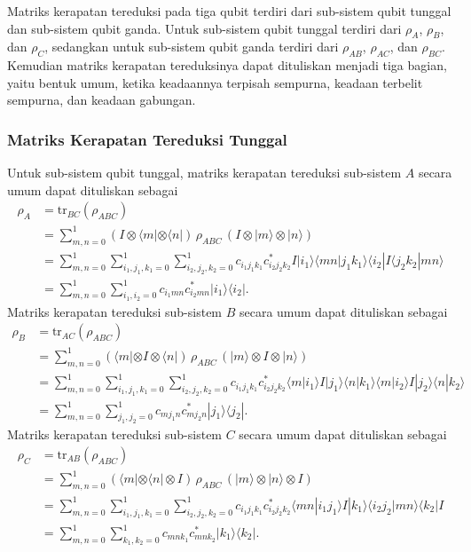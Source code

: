 Matriks kerapatan tereduksi pada tiga qubit terdiri dari sub-sistem qubit tunggal dan sub-sistem qubit ganda. Untuk sub-sistem qubit tunggal terdiri dari $\rho_A$, $\rho_B$, dan $\rho_C$, sedangkan untuk sub-sistem qubit ganda terdiri dari $\rho_{AB}$, $\rho_{AC}$, dan $\rho_{BC}$. Kemudian matriks kerapatan tereduksinya dapat dituliskan menjadi tiga bagian, yaitu bentuk umum, ketika keadaannya terpisah sempurna, keadaan terbelit sempurna, dan keadaan gabungan.

\subsubsection{Matriks Kerapatan Tereduksi Tunggal}
Untuk sub-sistem qubit tunggal, matriks kerapatan tereduksi sub-sistem $A$ secara umum dapat dituliskan sebagai
\begin{align}
	\rho_A &= \mathrm{tr}_{BC}(\rho_{ABC}) \nonumber \\
	&= \sum_{m,n=0}^{1} (I \otimes \langle m| \otimes \langle n|)\, \rho_{ABC}\, (I \otimes |m\rangle \otimes |n\rangle) \nonumber \\
	&= \sum_{m,n=0}^{1} \sum_{i_1,j_1,k_1=0}^{1} \sum_{i_2,j_2,k_2=0}^{1}
	c_{i_1 j_1 k_1}c^{*}_{i_2 j_2 k_2}
	I |i_1\rangle \langle mn|j_1 k_1\rangle \langle i_2| I \langle j_2 k_2|mn\rangle \nonumber \\
	&= \sum_{m,n=0}^{1} \sum_{i_1,i_2=0}^{1}
	c_{i_1 m n}c^{*}_{i_2 m n}
	|i_1\rangle \langle i_2|\label{rhoA3qubit}.
\end{align}
Matriks kerapatan tereduksi sub-sistem $B$ secara umum dapat dituliskan sebagai
\begin{align}
	\rho_B &= \mathrm{tr}_{AC}(\rho_{ABC}) \nonumber \\
	&= \sum_{m,n=0}^{1} (\langle m| \otimes I \otimes \langle n|)\, \rho_{ABC}\, (|m\rangle \otimes I \otimes |n\rangle) \nonumber \\
	&= \sum_{m,n=0}^{1} \sum_{i_1,j_1,k_1=0}^{1} \sum_{i_2,j_2,k_2=0}^{1}
	c_{i_1 j_1 k_1}c^{*}_{i_2 j_2 k_2}
	\langle m|i_1\rangle I |j_1\rangle \langle n|k_1\rangle
	\langle m|i_2\rangle I |j_2\rangle \langle n|k_2\rangle \nonumber \\
	&= \sum_{m,n=0}^{1} \sum_{j_1,j_2=0}^{1}
	c_{m j_1 n}c^{*}_{m j_2 n}
	|j_1\rangle \langle j_2|\label{rhoB3qubit}.
\end{align}
Matriks kerapatan tereduksi sub-sistem $C$ secara umum dapat dituliskan sebagai
\begin{align}
	\rho_C &= \mathrm{tr}_{AB}(\rho_{ABC}) \nonumber \\
	&= \sum_{m,n=0}^{1} (\langle m| \otimes \langle n| \otimes I)\, \rho_{ABC}\, (|m\rangle \otimes |n\rangle \otimes I) \nonumber \\
	&= \sum_{m,n=0}^{1} \sum_{i_1,j_1,k_1=0}^{1} \sum_{i_2,j_2,k_2=0}^{1}
	c_{i_1 j_1 k_1}c^{*}_{i_2 j_2 k_2}
	\langle mn|i_1 j_1\rangle I |k_1\rangle
	\langle i_2 j_2|mn\rangle \langle k_2| I \nonumber \\
	&= \sum_{m,n=0}^{1} \sum_{k_1,k_2=0}^{1}
	c_{m n k_1}c^{*}_{m n k_2}
	|k_1\rangle \langle k_2|\label{rhoC3qubit}.
\end{align}

